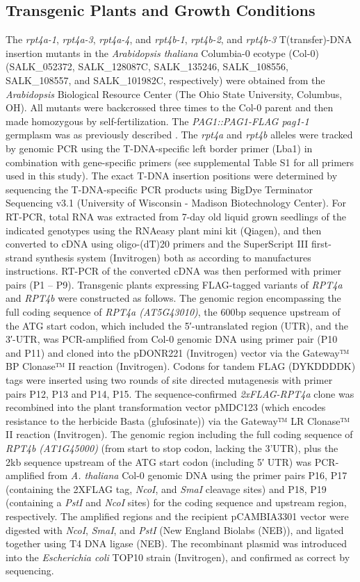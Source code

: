 \subsection{Transgenic Plants and Growth Conditions}
The \textit{rpt4a-1},\textit{ rpt4a-3},\textit{ rpt4a-4}, and \textit{rpt4b-1}, \textit{rpt4b-2}, and \textit{rpt4b-3} T(transfer)-DNA insertion mutants in the \textit{Arabidopsis thaliana} Columbia-0 ecotype (Col-0) (SALK\_052372, SALK\_128087C, SALK\_135246, SALK\_108556, SALK\_108557, and SALK\_101982C, respectively) were obtained from the \textit{Arabidopsis} Biological Resource Center (The Ohio State University, Columbus, OH). All mutants were backcrossed three times to the Col-0 parent and then made homozygous by self-fertilization. The \textit{PAG1::PAG1-FLAG pag1-1} germplasm was as previously described \citep{book10}. The \textit{rpt4a} and \textit{rpt4b} alleles were tracked by genomic PCR using the T-DNA-specific left border primer (Lba1) in combination with gene-specific primers (see supplemental Table S1 for all primers used in this study). The exact T-DNA insertion positions were determined by sequencing the T-DNA-specific PCR products using BigDye Terminator Sequencing v3.1 (University of Wisconsin - Madison Biotechnology Center). For RT-PCR, total RNA was extracted from 7-day old liquid grown seedlings of the indicated genotypes using the RNAeasy plant mini kit (Qiagen), and then converted to cDNA using oligo-(dT)20 primers and the SuperScript III first-strand synthesis system (Invitrogen) both as according to manufactures instructions.  RT-PCR of the converted cDNA was then performed with primer pairs (P1 – P9). 
	Transgenic plants expressing FLAG-tagged variants of \textit{RPT4a} and \textit{RPT4b} were constructed as follows. The genomic region encompassing the full coding sequence of \textit{RPT4a (AT5G43010)}, the 600bp sequence upstream of the ATG start codon, which included the 5′-untranslated region (UTR), and the 3′-UTR, was PCR-amplified from Col-0 genomic DNA using primer pair (P10 and P11) and cloned into the pDONR221 (Invitrogen) vector via the Gateway™ BP Clonase™ II reaction (Invitrogen). Codons for tandem FLAG (DYKDDDDK) tags were inserted using two rounds of site directed mutagenesis \citep{edelheit09} with primer pairs P12, P13 and P14, P15. The sequence-confirmed \textit{2xFLAG-RPT4a} clone was recombined into the plant transformation vector pMDC123 (which encodes resistance to the herbicide Basta (glufosinate)) via the Gateway™ LR Clonase™ II reaction (Invitrogen). The genomic region including the full coding sequence of \textit{RPT4b (AT1G45000)} (from start to stop codon, lacking the 3’UTR), plus the 2kb sequence upstream of the ATG start codon (including 5′ UTR) was PCR-amplified from \textit{A. thaliana} Col-0 genomic DNA using the primer pairs P16, P17 (containing the 2XFLAG tag, \textit{NcoI}, and \textit{SmaI} cleavage sites) and P18, P19 (containing a \textit{PstI} and \textit{NcoI} sites) for the coding sequence and upstream region, respectively. The amplified regions and the recipient pCAMBIA3301 vector were digested with \textit{NcoI}, \textit{SmaI}, and \textit{PstI} (New England Biolabs (NEB)), and ligated together using T4 DNA ligase (NEB). The recombinant plasmid was introduced into the \textit{Escherichia coli} TOP10 strain (Invitrogen), and confirmed as correct by sequencing. 
